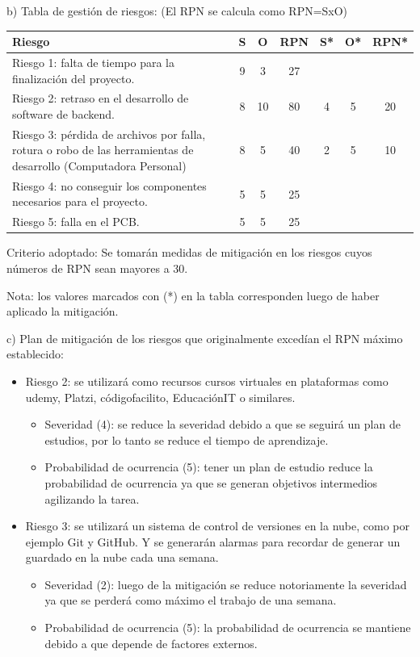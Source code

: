 \documentclass[11pt]{charter}
\begin{document}
b) Tabla de gestión de riesgos: (El RPN se calcula como RPN=SxO)

\begin{table}[htpb]
\centering
\begin{tabularx}{\linewidth}{@{}|X|c|c|c|c|c|c|@{}}
\hline
\rowcolor[HTML]{C0C0C0} 
Riesgo & S & O & RPN & S* & O* & RPN* \\ \hline
Riesgo 1: falta de tiempo para la finalización del proyecto. & 9  & 3  & 27 &    &    &      \\ \hline
Riesgo 2: retraso en el desarrollo de software de backend. & 8  & 10 & 80 & 4  & 5  & 20   \\ \hline
Riesgo 3: pérdida de archivos por falla, rotura o robo de las herramientas de desarrollo (Computadora Personal) & 8  & 5  & 40 & 2  & 5  & 10   \\ \hline
Riesgo 4: no conseguir los componentes necesarios para el proyecto. & 5  & 5  & 25 &    &    &      \\ \hline
Riesgo 5: falla en el PCB. & 5  & 5  & 25 &    &    &      \\ \hline
\end{tabularx}%
\end{table}

Criterio adoptado: 
Se tomarán medidas de mitigación en los riesgos cuyos números de RPN sean mayores a 30.

Nota: los valores marcados con (*) en la tabla corresponden luego de haber aplicado la mitigación.

c) Plan de mitigación de los riesgos que originalmente excedían el RPN máximo establecido:

\begin{itemize}
\item Riesgo 2: se utilizará como recursos cursos virtuales en plataformas como udemy, Platzi, códigofacilito, EducaciónIT o similares.
	\begin{itemize}
	\item Severidad (4): se reduce la severidad debido a que se seguirá un plan de estudios, por lo tanto se reduce el tiempo de aprendizaje.
	\item Probabilidad de ocurrencia (5): tener un plan de estudio reduce la probabilidad de ocurrencia ya que se generan objetivos intermedios agilizando la tarea. 
	\end{itemize}
\item Riesgo 3: se utilizará un sistema de control de versiones en la nube, como por ejemplo Git y GitHub. Y se generarán alarmas para recordar de generar un guardado en la nube cada una semana.
	\begin{itemize}
	\item Severidad (2): luego de la mitigación se reduce notoriamente la severidad ya que se perderá como máximo el trabajo de una semana.
	\item Probabilidad de ocurrencia (5): la probabilidad de ocurrencia se mantiene debido a que depende de factores externos. 
	\end{itemize}
\end{itemize}  
 
\end{document}
